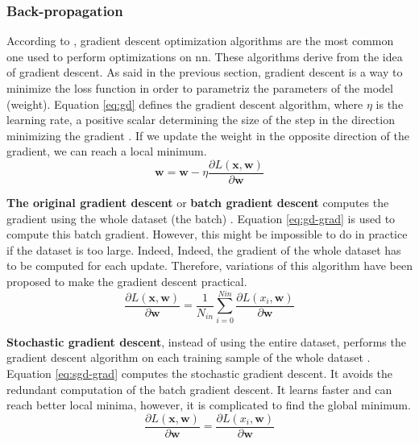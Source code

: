 \subsubsection{Back-propagation} \label{subs:trainbackward}
According to \textcite{ruder_overview_2017}, gradient descent optimization algorithms are the most common one used  to perform optimizations on \acrshort{nn}. These algorithms derive from the idea of gradient descent. As said in the previous section, gradient descent is a way to minimize the loss function in order to parametriz the parameters of the model (weight). Equation \eqref{eq:gd} defines the gradient descent algorithm, where $\eta$ is the learning rate, a positive scalar determining the size of the step in the direction minimizing the gradient \cite{ruder_overview_2017, goodfellow_deep_2016}. If we update the weight in the opposite direction of the gradient, we can reach a local minimum.
%
\begin{equation}
    \boldsymbol{w} = \boldsymbol{w} - \eta \frac{ \partial L( \boldsymbol{x}, \boldsymbol{w} ) }{\partial \boldsymbol{w}}
    \label{eq:gd}
\end{equation}

\textbf{The original gradient descent} or \textbf{batch gradient descent} computes the gradient using the whole dataset (the batch) \cite{ruder_overview_2017, matteucci_artificial_2019}. Equation \eqref{eq:gd-grad} is used to compute this batch gradient. However, this might be impossible to do in practice if the dataset is too large. Indeed, Indeed, the gradient of the whole dataset has to be computed for each update. Therefore, variations of this algorithm have been proposed to make the gradient descent practical.
%
\begin{equation}
    \frac{ \partial L( \boldsymbol{x}, \boldsymbol{w} ) }{\partial \boldsymbol{w}} = \frac{1}{N_{in}} \sum^{Nin}_{i = 0} \frac{ \partial L( x_i, \boldsymbol{w} ) }{\partial \boldsymbol{w}}
    \label{eq:gd-grad}
\end{equation}

\textbf{Stochastic gradient descent}, instead of using the entire dataset, performs the gradient descent algorithm on each training sample of the whole dataset \cite{ruder_overview_2017, matteucci_artificial_2019}. Equation \eqref{eq:sgd-grad} computes the stochastic gradient descent. It avoids the redundant computation of the batch gradient descent. It learns faster and can reach better local minima, however, it is complicated to find the global minimum.
%
\begin{equation}
    \frac{ \partial L( \boldsymbol{x}, \boldsymbol{w} ) }{\partial \boldsymbol{w}} = \frac{ \partial L( x_i, \boldsymbol{w} ) }{\partial \boldsymbol{w}}
    \label{eq:sgd-grad}
\end{equation}

